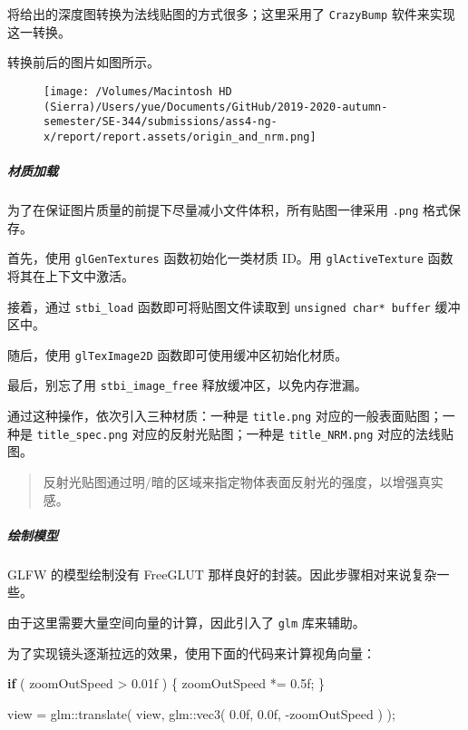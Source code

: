 \documentclass[
]{article}
\newenvironment{Shaded}{}{}
\newcommand{\BuiltInTok}[1]{#1}
\newcommand{\ControlFlowTok}[1]{\textcolor[rgb]{0.00,0.44,0.13}{\textbf{#1}}}
\newcommand{\FloatTok}[1]{\textcolor[rgb]{0.25,0.63,0.44}{#1}}
\newcommand{\NormalTok}[1]{#1}
\begin{document}
将给出的深度图转换为法线贴图的方式很多；这里采用了 \texttt{CrazyBump}
软件来实现这一转换。

转换前后的图片如图所示。

\begin{figure}
\centering
\texttt{[image: /Volumes/Macintosh HD (Sierra)/Users/yue/Documents/GitHub/2019-2020-autumn-semester/SE-344/submissions/ass4-ng-x/report/report.assets/origin\_and\_nrm.png]}
\caption{}
\end{figure}

\hypertarget{header-n116}{%
\subparagraph{材质加载}\label{header-n116}}

为了在保证图片质量的前提下尽量减小文件体积，所有贴图一律采用
\texttt{.png} 格式保存。

首先，使用 \texttt{glGenTextures} 函数初始化一类材质 ID。用
\texttt{glActiveTexture} 函数将其在上下文中激活。

接着，通过 \texttt{stbi\_load} 函数即可将贴图文件读取到
\texttt{unsigned\ char*\ buffer} 缓冲区中。

随后，使用 \texttt{glTexImage2D} 函数即可使用缓冲区初始化材质。

最后，别忘了用 \texttt{stbi\_image\_free} 释放缓冲区，以免内存泄漏。

通过这种操作，依次引入三种材质：一种是 \texttt{title.png}
对应的一般表面贴图；一种是 \texttt{title\_spec.png}
对应的反射光贴图；一种是 \texttt{title\_NRM.png} 对应的法线贴图。

\begin{quote}
反射光贴图通过明/暗的区域来指定物体表面反射光的强度，以增强真实感。
\end{quote}

\hypertarget{header-n125}{%
\subparagraph{绘制模型}\label{header-n125}}

GLFW 的模型绘制没有 FreeGLUT 那样良好的封装。因此步骤相对来说复杂一些。

由于这里需要大量空间向量的计算，因此引入了 \texttt{glm} 库来辅助。

为了实现镜头逐渐拉远的效果，使用下面的代码来计算视角向量：

\begin{Shaded}
\begin{Highlighting}[]
\ControlFlowTok{if}\NormalTok{ ( zoomOutSpeed > }\FloatTok{0.01}\BuiltInTok{f}\NormalTok{ ) \{}
\NormalTok{  zoomOutSpeed *= }\FloatTok{0.5}\BuiltInTok{f}\NormalTok{;}
\NormalTok{\}}

\NormalTok{view = glm::translate( view, glm::vec3( }\FloatTok{0.0}\BuiltInTok{f}\NormalTok{, }\FloatTok{0.0}\BuiltInTok{f}\NormalTok{, -zoomOutSpeed ) );}
\end{Highlighting}
\end{Shaded}
\end{document}
